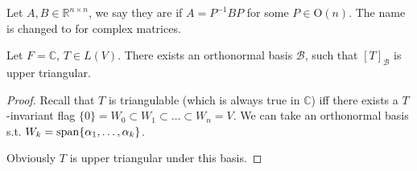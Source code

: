 \begin{definition}
	Let $A, B\in \mathbb{R}^{n\times n}$, we say they are 
	if $A = P^{-1}BP$ for some $P\in \mathrm{O}(n)$. The name is changed to
	 for complex matrices.
\end{definition}

\begin{theorem}
    Let $F = \mathbb{C}$, $T\in L(V)$. There exists an orthonormal basis $\mathcal{B}$,
	such that $[T]_{\mathcal{B}}$ is upper triangular.
\end{theorem}
\begin{proof}[Proof]
    Recall that $T$ is triangulable (which is always true in $\mathbb{C}$)
	iff there exists a $T$-invariant flag
	$\{0\} = W_0 \subset W_1 \subset\dots \subset W_n = V$. We can take an
	orthonormal basis s.t. $W_k = \operatorname{span} \{\alpha_1, \dots, \alpha_k\}$.

	Obviously $T$ is upper triangular under this basis.
\end{proof}

